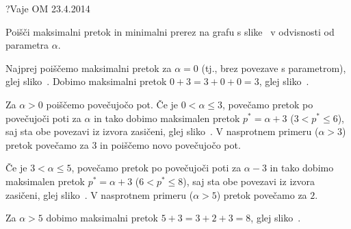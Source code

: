 \begin{naloga}{?}{Vaje OM 23.4.2014}
\begin{vprasanje}
Poišči maksimalni pretok in minimalni prerez na grafu s slike~\fig
v odvisnosti od parametra $\alpha$.

\begin{slika}
\pgfslika
{}
\end{slika}
\end{vprasanje}

\begin{odgovor}
Najprej poiščemo maksimalni pretok za $\alpha = 0$
(tj., brez povezave s parametrom), glej sliko~.
Dobimo maksimalni pretok $0+3 = 3+0+0 = 3$, glej sliko~.

Za $\alpha > 0$ poiščemo povečujočo pot.
Če je $0 < \alpha \le 3$,
povečamo pretok po povečujoči poti za $\alpha$
in tako dobimo maksimalen pretok $p^* = \alpha+3$ ($3 < p^* \le 6$),
saj sta obe povezavi iz izvora zasičeni, glej sliko~.
V nasprotnem primeru ($\alpha > 3$) pretok povečamo za $3$
in poiščemo novo povečujočo pot.

Če je $3 < \alpha \le 5$, povečamo pretok po povečujoči poti za $\alpha-3$
in tako dobimo maksimalen pretok $p^* = \alpha+3$ ($6 < p^* \le 8$),
saj sta obe povezavi iz izvora zasičeni, glej sliko~.
V nasprotnem primeru ($\alpha > 5$) pretok povečamo za $2$.

Za $\alpha > 5$ dobimo maksimalni pretok $5+3 = 3+2+3 = 8$,
glej sliko~.

\begin{slika}
\end{slika}
\begin{slika}
\end{slika}
\begin{slika}
\end{slika}
\begin{slika}
\end{slika}
\begin{slika}
\end{slika}
\end{odgovor}
\end{naloga}

